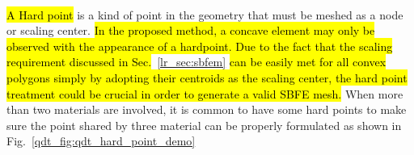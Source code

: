 \paragraph{}
\hl{A Hard point} is a kind of point in the geometry that must be meshed as a node or scaling center.
\hl{In the proposed method, a concave element may only be observed with the appearance of a hardpoint.
Due to the fact that the scaling requirement discussed in Sec.}~\ref{lr_sec:sbfem} \hl{can be easily met for all convex polygons simply by adopting their centroids as the scaling center, the hard point treatment could be crucial in order to generate a valid SBFE mesh.}
When more than two materials are involved, it is common to have some hard points to make sure the point shared by three material can be properly formulated as shown in Fig.~\ref{qdt_fig:qdt_hard_point_demo}
